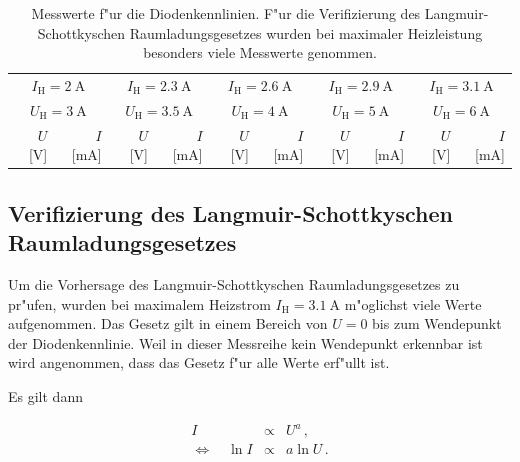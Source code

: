 		\begin{table}[h!]
			\begin{center}
				\label{messung1}
				\caption{Messwerte f"ur die Diodenkennlinien. F"ur die Verifizierung des Langmuir-Schottkyschen Raumladungsgesetzes wurden bei maximaler Heizleistung besonders viele Messwerte genommen.}
				\begin{tabular}{|r|r||r|r||r|r||r|r||r|r|}
					\hline
						\multicolumn{2}{|c||}{$I_\mathrm{H} = \SI{2}{\ampere}$} &
						\multicolumn{2}{c||}{$I_\mathrm{H} = \SI{2.3}{\ampere}$} &
						\multicolumn{2}{c||}{$I_\mathrm{H} = \SI{2.6}{\ampere}$} &
						\multicolumn{2}{c||}{$I_\mathrm{H} = \SI{2.9}{\ampere}$} &
						\multicolumn{2}{c|}{$I_\mathrm{H} = \SI{3.1}{\ampere}$} \\
						\multicolumn{2}{|c||}{$U_\mathrm{H} = \SI{3}{\ampere}$} &
						\multicolumn{2}{c||}{$U_\mathrm{H} = \SI{3.5}{\ampere}$} &
						\multicolumn{2}{c||}{$U_\mathrm{H} = \SI{4}{\ampere}$} &
						\multicolumn{2}{c||}{$U_\mathrm{H} = \SI{5}{\ampere}$} &
						\multicolumn{2}{c|}{$U_\mathrm{H} = \SI{6}{\ampere}$} \\
					\hline 
						$U$ [V] & $I$ [mA] & $U$ [V] & $I$ [mA] & $U$ [V] & $I$ [mA] & $U$ [V] & $I$ [mA] & $U$ [V] & $I$ [mA] \\
					\hline 
					\hline
						
					\hline 
				\end{tabular}
			\end{center}
		\end{table}

		\clearpage

	\subsection{Verifizierung des Langmuir-Schottkyschen Raumladungsgesetzes}
		\label{subsec:langmuir}
		Um die Vorhersage des Langmuir-Schottkyschen Raumladungsgesetzes zu pr"ufen, wurden bei maximalem Heizstrom $I_\mathrm{H} = \SI{3.1}{\ampere}$ m"oglichst viele Werte aufgenommen.
		Das Gesetz gilt in einem Bereich von $U = 0$ bis zum Wendepunkt der Diodenkennlinie.
		Weil in dieser Messreihe kein Wendepunkt erkennbar ist wird angenommen, dass das Gesetz f"ur alle Werte erf"ullt ist.

		Es gilt dann

		\begin{eqnarray*}
			I & \propto & U^a\,, \\
			\Leftrightarrow \quad \ln{I} & \propto & a \ln{U}\,.
		\end{eqnarray*}


